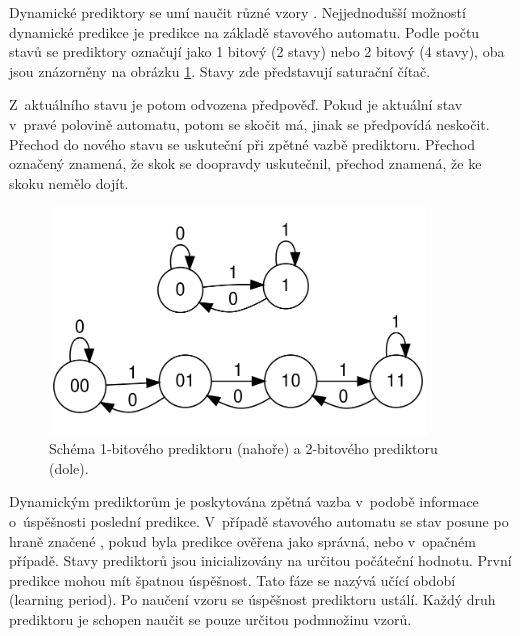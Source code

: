 Dynamické prediktory se umí naučit různé vzory \cite{avs}.
Nejjednodušší možností dynamické predikce je predikce na základě stavového automatu.
Podle počtu stavů se prediktory označují jako 1 bitový (2 stavy) nebo 2 bitový (4 stavy), oba jsou znázorněny na obrázku \ref{fsmpredictor}.
Stavy zde představují saturační čítač.

Z~aktuálního stavu je potom odvozena předpověď.
Pokud je aktuální stav v~pravé polovině automatu, potom se skočit má, jinak se předpovídá neskočit.
Přechod do nového stavu se uskuteční při zpětné vazbě prediktoru. Přechod označený  znamená, že skok se doopravdy uskutečnil, přechod  znamená, že ke skoku nemělo dojít.

\begin{figure}[ht]\centering
	
	
	
  \includegraphics[width=10cm]{obrazky-figures/fsmpredictors.png}
  \caption{Schéma 1-bitového prediktoru (nahoře) a 2-bitového prediktoru (dole). }
  \label{fsmpredictor}
\end{figure}

Dynamickým prediktorům je poskytována zpětná vazba v~podobě informace o~úspěšnosti poslední predikce.
V~případě stavového automatu se stav posune po hraně značené \uv{+}, pokud byla predikce ověřena jako správná, nebo \uv{-} v~opačném případě.
Stavy prediktorů jsou inicializovány na určitou počáteční hodnotu.
První predikce mohou mít špatnou úspěšnost.
Tato fáze se nazývá učící období (learning period).
Po naučení vzoru se úspěšnost prediktoru ustálí.
Každý druh prediktoru je schopen naučit se pouze určitou podmnožinu vzorů.

